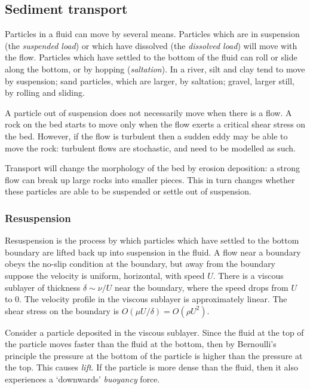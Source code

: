 \subsection{Sediment transport}

Particles in a fluid can move by several means. Particles which are in suspension (the \textit{suspended load}) or which have dissolved (the \textit{dissolved load}) will move with the flow. Particles which have settled to the bottom of the fluid can roll or slide along the bottom, or by hopping (\textit{saltation}). In a river, silt and clay tend to move by suspension; sand particles, which are larger, by saltation; gravel, larger still, by rolling and sliding. 

A particle out of suspension does not necessarily move when there is a flow. A rock on the bed starts to move only when the flow exerts a critical shear stress on the bed. However, if the flow is turbulent then a sudden eddy may be able to move the rock: turbulent flows are stochastic, and need to be modelled as such. 

Transport will change the morphology of the bed by erosion deposition: a strong flow can break up large rocks into smaller pieces. This in turn changes whether these particles are able to be suspended or settle out of suspension.  

\subsubsection{Resuspension}

Resuspension is the process by which particles which have settled to the bottom boundary are lifted back up into suspension in the fluid. A flow near a boundary obeys the no-slip condition at the boundary, but away from the boundary suppose the velocity is uniform, horizontal, with speed $U$. There is a viscous sublayer of thickness $\delta\sim\nu/U$ near the boundary, where the speed drops from $U$ to $0$. The velocity profile in the viscous sublayer is approximately linear. The shear stress on the boundary is $O(\mu U/\delta) = O(\rho U^2)$.

Consider a particle deposited in the viscous sublayer. Since the fluid at the top of the particle moves faster than the fluid at the bottom, then by Bernoulli's principle the pressure at the bottom of the particle is higher than the pressure at the top. This causes \textit{lift}. If the particle is more dense than the fluid, then it also experiences a `downwards' \textit{buoyancy} force. 



